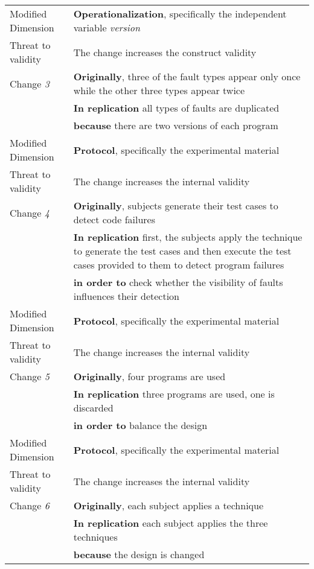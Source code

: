 \begin{table*}[h]
\begin{tabularx}{\textwidth}{
  >{\hsize=0.3\hsize}X
  >{\hsize=0.8\hsize}X}
    Modified Dimension & 
   \textbf{Operationalization}, specifically the independent variable  \textit {version} \\ 
    Threat to validity & The change increases the construct validity \\  \hline
    
    Change \textit{3}   & \textbf{Originally}, three of the fault types appear only once while the other three types appear twice \\& \textbf{In replication} all types of faults are duplicated \\& \textbf{because} there are two versions of each program \\ 

    Modified Dimension & 
   \textbf{Protocol}, specifically the experimental material  \\ 
    Threat to validity & The change increases the internal validity \\  \hline
    
    Change \textit{4}   & \textbf{Originally}, subjects generate their test cases to detect code failures \\& \textbf{In replication} first, the subjects apply the technique to generate the test cases and then execute the test cases provided to them to detect program failures \\& \textbf{in order to} check whether the visibility of faults influences their detection \\ 

    Modified Dimension & 
   \textbf{Protocol}, specifically the experimental material  \\ 
    Threat to validity & The change increases the internal validity \\  \hline
    
    Change \textit{5}   & \textbf{Originally}, four programs are used \\& \textbf{In replication} three programs are used, one is discarded \\& \textbf{in order to} balance the design \\ 

    Modified Dimension & 
   \textbf{Protocol}, specifically the experimental material  \\ 
    Threat to validity & The change increases the internal validity \\  \hline
    
    Change \textit{6}   & \textbf{Originally}, each subject applies a technique \\& \textbf{In replication} each subject applies the three techniques \\& \textbf{because} the design is changed \\ 


\end{tabularx}
\end{table*}
